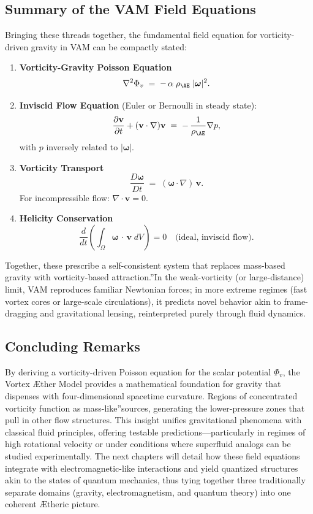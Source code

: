 \documentclass[a4paper,12pt]{article}
\begin{document}
\subsection{Summary of the VAM Field Equations}

Bringing these threads together, the fundamental field equation for vorticity-driven gravity in VAM can be compactly stated:

\begin{enumerate}
    \item \textbf{Vorticity-Gravity Poisson Equation}
    \[
        \nabla^2 \Phi_v \;=\; -\,\alpha\;\rho_{\mathrm{\AE}}\;\lvert \boldsymbol{\omega} \rvert^2.
    \]

    \item \textbf{Inviscid Flow Equation} (Euler or Bernoulli in steady state):
    \[
        \frac{\partial \mathbf{v}}{\partial t} + (\mathbf{v}\cdot\nabla)\mathbf{v} \;=\; -\,\frac{1}{\rho_{\mathrm{\AE}}}\nabla p,
    \]
    with \(p\) inversely related to \(\lvert \boldsymbol{\omega} \rvert\).

    \item \textbf{Vorticity Transport}
    \[
        \frac{D \boldsymbol{\omega}}{Dt} \;=\;  (\boldsymbol{\omega} \cdot \nabla)\,\mathbf{v}.
    \]
    For incompressible flow: \(\nabla \cdot \mathbf{v} = 0\).

    \item \textbf{Helicity Conservation}
    \[
        \frac{d}{dt}  \left( \int_{\Omega} \boldsymbol{\omega}\,\cdot\,\mathbf{v}\; dV \right) = 0  \quad \text{(ideal, inviscid flow)}.
    \]
\end{enumerate}

Together, these prescribe a self-consistent system that replaces mass-based gravity with vorticity-based \grqq attraction.\textquotedblright In the weak-vorticity (or large-distance) limit, VAM reproduces familiar Newtonian forces; in more extreme regimes (fast vortex cores or large-scale circulations), it predicts novel behavior akin to frame-dragging and gravitational lensing, reinterpreted purely through fluid dynamics.

\subsection{Concluding Remarks}

By deriving a vorticity-driven Poisson equation for the scalar potential \(\Phi_v\), the Vortex Æther Model provides a mathematical foundation for gravity that dispenses with four-dimensional spacetime curvature. Regions of concentrated vorticity function as \grqq mass-like\textquotedblright sources, generating the lower-pressure zones that pull in other flow structures. This insight unifies gravitational phenomena with classical fluid principles, offering testable predictions—particularly in regimes of high rotational velocity or under conditions where superfluid analogs can be studied experimentally. The next chapters will detail how these field equations integrate with electromagnetic-like interactions and yield quantized structures akin to the states of quantum mechanics, thus tying together three traditionally separate domains (gravity, electromagnetism, and quantum theory) into one coherent Ætheric picture.
\end{document}
